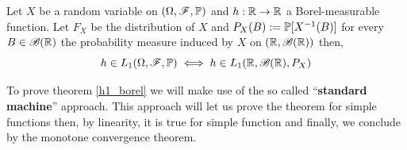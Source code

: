 \documentclass[../TGMAFFIRO.tex]{subfiles}
\begin{document}
\begin{theorem}\label{h1_borel}
		Let $X$ be a random variable on $(\Omega, \mathscr{F}, \mathbb{P})$ and $h: \mathbb{R} \to \mathbb{R}$ a Borel-measurable function. Let $F_X$ be the distribution of $X$ and $P_X(B):= \mathbb{P}[X^{-1}(B)]$ for every $B \in \mathscr{B}(\mathbb{R})$ the probability measure induced by $X$ on $(\mathbb{R}, \mathscr{B}(\mathbb{R}))$ then,
		\begin{equation}
			h \in L_1(\Omega, \mathscr{F}, \mathbb{P}) \iff h \in L_1(\mathbb{R}, \mathscr{B}(\mathbb{R}), P_X)
		\end{equation}
\end{theorem}

To prove theorem \ref{h1_borel} we will make use of the so called ``\textbf{standard machine}'' approach. This approach will let us prove the theorem for simple functions then, by linearity, it is true for simple function and finally, we conclude by the monotone convergence theorem.
\end{document}
